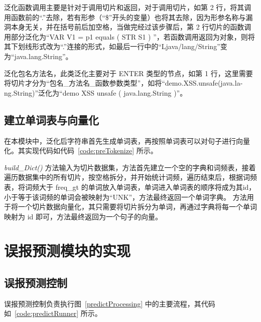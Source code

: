 泛化函数调用主要是针对于调用切片和返回，对于调用切片，如第 2 行，将其调用函数前的“.”去除，若有形参（“\$”开头的变量）也将其去除，因为形参名称与漏洞本身无关，并在括号前后加空格，当做完经过该步骤后，第 2 行切片的函数调用部分泛化为“VAR V1 = p1 equals ( STR S1 ) ”，若函数调用返回为对象，则将其下划线形式改为“.”连接的形式，如最后一行中的“Ljava/lang/String”变为“java.lang.String”。

泛化包名方法名，此类泛化主要对于 ENTER 类型的节点，如第 1 行，这里需要将切片才分为“包名\_方法名\_函数参数类型”，如将“demo.XSS.unsafe(java.la-\\ng.String)”泛化为“demo XSS unsafe ( java.lang.String )”。\\

\subsection{建立单词表与向量化}

在本模块中，泛化后字符串首先生成单词表，再按照单词表可以对句子进行向量化。其实现代码如代码~\ref{code:preTokenize} 所示。

\begin{minipage}[!htbp]{0.9\textwidth}
    
\end{minipage}

\textit{build\_Dict()} 方法输入为切片数据集，方法首先建立一个空的字典和词频表，接着遍历数据集中的所有切片，按空格拆分，并开始统计词频，遍历结束后，根据词频表，将词频大于 freq\_gt 的单词放入单词表，单词进入单词表的顺序将成为其id，小于等于该词频的单词会被映射为“UNK”，方法最终返回一个单词字典。
 方法用于将一个切片数据向量化，其只需要将切片拆分为单词，再通过字典将每一个单词映射为 id 即可，方法最终返回为一个句子的向量。\\

\section{误报预测模块的实现}

\subsection{误报预测控制}
误报预测控制负责执行图~\ref{predictProcessing} 中的主要流程，其代码如~\ref{code:predictRunner} 所示。

\begin{minipage}[!htbp]{0.9\textwidth}
    
\end{minipage}


